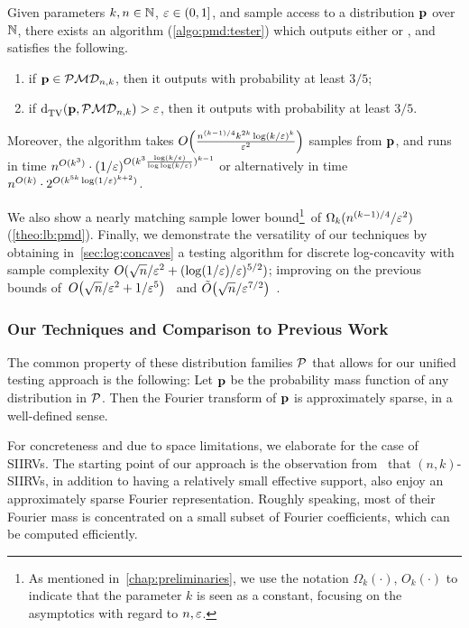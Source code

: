 \begin{theorem}\label{theo:testing:pmd}
    Given parameters $k,n\in\N$, $\eps\in(0,1]$, and sample access to a distribution $\p$ over $\N$, there exists an algorithm (\cref{algo:pmd:tester}) which outputs either \accept or \reject, and satisfies the following.
    \begin{enumerate}
        \item if $\p \in \classpmd[n]{k}$, then it outputs \accept with probability at least $3/5$;
        \item if $\totalvardist{\p}{\classpmd[n]{k}} > \eps$, then it outputs \reject with probability at least $3/5$.
    \end{enumerate}
    Moreover, the algorithm takes $\bigO{\frac{n^{(k-1)/4} k^{2k} \log(k/\eps)^k}{\eps^2}}$ samples from $\p$, 
    and runs in time $n^{O(k^3)} \cdot (1/\eps)^{O(k^3\frac{\log(k/\eps)}{\log\log(k/\eps)})^{k-1}}$ or alternatively in time $n^{O(k)} \cdot  2^{O(k^{5k} \log(1/\eps)^{k+2})}$.
\end{theorem}
We also show a nearly matching sample lower bound\footnote{As mentioned in~\cref{chap:preliminaries}, we use the notation $\Omega_k(\cdot)$, $O_k(\cdot)$ to indicate that the parameter $k$ is seen as a constant, focusing on the asymptotics with regard to $n,\eps$.}\ of $\Omega_k( n^{{(k-1)}/{4}}/\eps^2 )$ (\cref{theo:lb:pmd}). Finally, we demonstrate the versatility of our techniques by obtaining in~\cref{sec:log:concaves} a testing algorithm for discrete log-concavity with sample complexity $O(\sqrt{n}/\eps^2 + (\log(1/\eps)/\eps)^{5/2})$; improving on the previous bounds of~$\bigO{{\sqrt{n}}/{\eps^{2}}+{1}/{\eps^5}}$~\cite{ADK:15} and $\tildeO{{\sqrt{n}}/{\eps^{7/2}}}$~\cite{CDGR:16}.


\subsubsection{Our Techniques and Comparison to Previous Work} \label{ssec:techniques}

The common property of these distribution families $\property$ that allows for our unified testing approach
is the following: Let $\p$ be the probability mass function of any distribution in $\property$. Then the Fourier transform
of $\p$ is approximately sparse, in a well-defined sense. 

For concreteness and due to space limitations,  we elaborate for the case of SIIRVs.
The starting point of our approach is the observation from~\cite{DKS:15} that $(n,k)$-SIIRVs, 
in addition to having a relatively small effective support, also enjoy an approximately sparse Fourier representation. 
Roughly speaking, most of their Fourier mass is concentrated on a small subset of Fourier coefficients, which can be computed efficiently.

